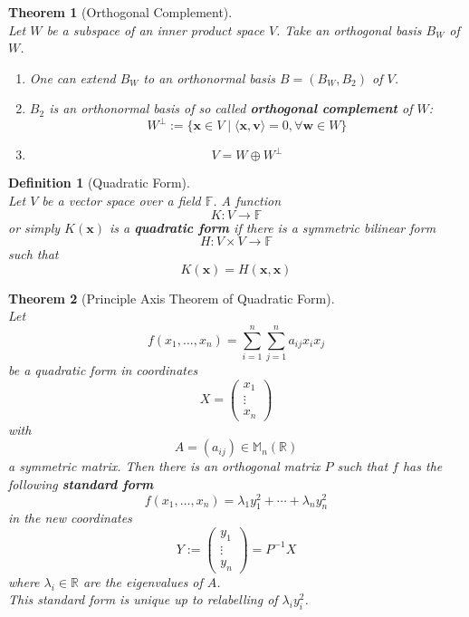 \documentclass[12pt]{article}
\newtheorem{definition}{Definition}[section]
\newtheorem{theorem}{Theorem}[section]
\theoremstyle{definition}
\begin{document}
\begin{theorem}[Orthogonal Complement]
\hfill\\\normalfont Let $W$ be a subspace of an inner product space $V$. Take an orthogonal basis $B_W$ of $W$.
\begin{enumerate}[label=(\arabic*)]
\item One can extend $B_W$ to an orthonormal basis $B = (B_W, B_2)$ of $V$.
\item $B_2$ is an orthonormal basis of so called \textbf{orthogonal complement} of $W$:
\[
W^\perp :=\{\mathbf{x}\in V\mid \langle \mathbf{x},\mathbf{v}\rangle =0,\forall \mathbf{w}\in W\}
\]
\item 
\[
V=W\oplus W^\perp
\]
\end{enumerate}
\end{theorem}
\begin{definition}[Quadratic Form]
\hfill\\\normalfont Let $V$ be a vector space over a field $\mathbb{F}$. A function
\[
K:V\to \mathbb{F}
\]
or simply $K(\mathbf{x})$ is a \textbf{quadratic form} if there is a symmetric bilinear form
\[
H:V\times V\to \mathbb{F}
\]
such that
\[
K(\mathbf{x})=H(\mathbf{x},\mathbf{x})
\]
\end{definition}
\begin{theorem}[Principle Axis Theorem of Quadratic Form]
\hfill\\\normalfont Let 
\[
f(x_1,\ldots, x_n) = \sum_{i=1}^n\sum_{j=1}^n a_{ij}x_ix_j
\]
be a quadratic form in coordinates
\[
X=\begin{pmatrix}
x_1\\
\vdots\\
x_n
\end{pmatrix}
\]
with 
\[
A=(a_{ij})\in\mathbb{M}_n(\mathbb{R})
\]
a symmetric matrix. Then there is an orthogonal matrix $P$ such that $f$ has the following \textbf{standard form}
\[
f(x_1,\ldots, x_n)=\lambda_1 y_1^2+\cdots+\lambda_n y_n^2
\]
in the new coordinates
\[
Y:=\begin{pmatrix}
y_1\\
\vdots\\
y_n
\end{pmatrix}=P^{-1}X
\]
where $\lambda_i\in\mathbb{R}$ are the eigenvalues of $A$.\\
This standard form is unique up to relabelling of $\lambda_i y_i^2$.
\end{theorem}
\clearpage
\end{document}
